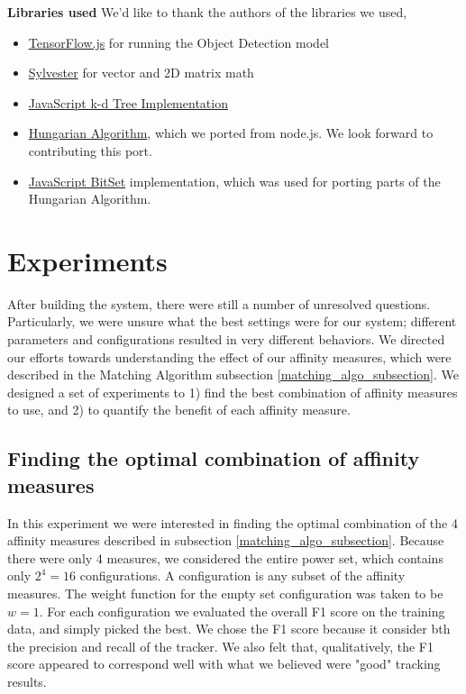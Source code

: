 \documentclass[10pt,twocolumn,letterpaper]{article}
\begin{document}
\textbf{Libraries used}
We'd like to thank the authors of the libraries we used,
\begin{itemize}
\item \href{https://www.tensorflow.org/js}{TensorFlow.js} for running the Object Detection model
\item  \href{http://sylvester.jcoglan.com/}{Sylvester} for vector and 2D matrix math
\item \href{https://github.com/ubilabs/kd-tree-javascript}{JavaScript k-d Tree Implementation}
\item \href{https://github.com/mattkrick/hungarian-on3}{Hungarian Algorithm}, which we ported from node.js. We look forward to contributing this port. 
\item \href{http://www.xarg.org/2014/03/javascript-bit-array/}{JavaScript BitSet} implementation, which was used for porting parts of the Hungarian Algorithm. 
\end{itemize}

\label{experiments_section}
\section{Experiments}
After building the system, there were still a number of unresolved questions.
Particularly, we were unsure what the best settings were for our system; different parameters and configurations resulted in very different behaviors.
We directed our efforts towards understanding the effect of our affinity measures, which were described in the Matching Algorithm subsection \ref{matching_algo_subsection}.
We designed a set of experiments to 1) find the best combination of affinity measures to use, and 2) to quantify the benefit of each affinity measure.

\label{optimal_combination_exp}
\subsection{Finding the optimal combination of affinity measures}
In this experiment we were interested in finding the optimal combination of the 4 affinity measures described in subsection \ref{matching_algo_subsection}.
Because there were only 4 measures, we considered the entire power set, which contains only $2^4 = 16$ configurations.
A configuration is any subset of the affinity measures.
The weight function for the empty set configuration was taken to be $w=1$.
For each configuration we evaluated the overall F1 score on the training data, and simply picked the best.
We chose the F1 score because it consider bth the precision and recall of the tracker.
We also felt that, qualitatively, the F1 score appeared to correspond well with what we believed were "good" tracking results.
\end{document}
